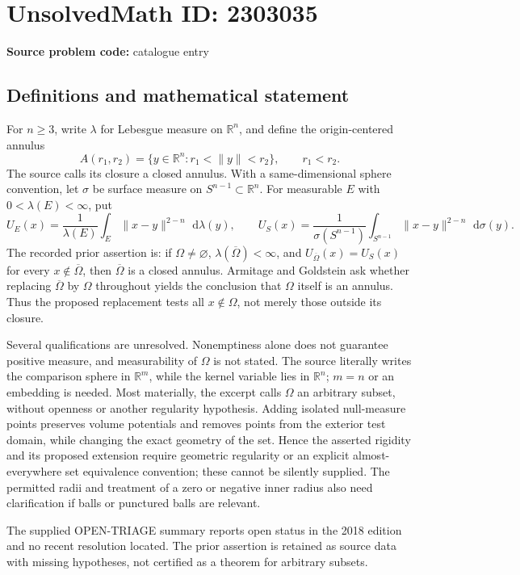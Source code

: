 \documentclass[11pt]{article}
\newcommand{\R}{\mathbb{R}}
\newcommand{\dd}{\,\mathrm{d}}
\begin{document}
\section*{UnsolvedMath ID: 2303035}
\textbf{Source problem code:} catalogue entry
\subsection{Definitions and mathematical statement}
For \(n\ge3\), write \(\lambda\) for Lebesgue measure on \(\R^n\), and define the origin-centered annulus
\[
A(r_1,r_2)=\{y\in\R^n:r_1<\|y\|<r_2\},\qquad r_1<r_2.
\]
The source calls its closure a closed annulus. With a same-dimensional sphere convention, let \(\sigma\) be surface measure on \(S^{n-1}\subset\R^n\). For measurable \(E\) with \(0<\lambda(E)<\infty\), put
\[
U_E(x)=\frac1{\lambda(E)}\int_E\|x-y\|^{2-n}\,\dd\lambda(y),\qquad
U_S(x)=\frac1{\sigma(S^{n-1})}\int_{S^{n-1}}\|x-y\|^{2-n}\,\dd\sigma(y).
\]
The recorded prior assertion is: if \(\Omega\ne\varnothing\), \(\lambda(\overline\Omega)<\infty\), and \(U_{\overline\Omega}(x)=U_S(x)\) for every \(x\notin\overline\Omega\), then \(\overline\Omega\) is a closed annulus. Armitage and Goldstein ask whether replacing \(\overline\Omega\) by \(\Omega\) throughout yields the conclusion that \(\Omega\) itself is an annulus. Thus the proposed replacement tests all \(x\notin\Omega\), not merely those outside its closure.

Several qualifications are unresolved. Nonemptiness alone does not guarantee positive measure, and measurability of \(\Omega\) is not stated. The source literally writes the comparison sphere in \(\R^m\), while the kernel variable lies in \(\R^n\); \(m=n\) or an embedding is needed. Most materially, the excerpt calls \(\Omega\) an arbitrary subset, without openness or another regularity hypothesis. Adding isolated null-measure points preserves volume potentials and removes points from the exterior test domain, while changing the exact geometry of the set. Hence the asserted rigidity and its proposed extension require geometric regularity or an explicit almost-everywhere set equivalence convention; these cannot be silently supplied. The permitted radii and treatment of a zero or negative inner radius also need clarification if balls or punctured balls are relevant.

The supplied OPEN-TRIAGE summary reports open status in the 2018 edition and no recent resolution located. The prior assertion is retained as source data with missing hypotheses, not certified as a theorem for arbitrary subsets.
\end{document}
